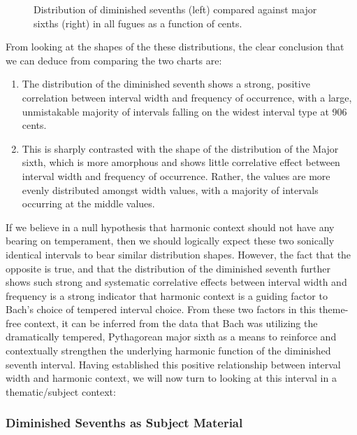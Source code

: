 \begin{figure}[H]
\vspace{1.5em}
    \centering
    \caption[Distribution of diminished sevenths compared against major sixths in all fugues as a function of cents. ]{Distribution of diminished sevenths (left) compared against major sixths (right) in all fugues as a function of cents.}
\end{figure}    From looking at the shapes of the these distributions, the clear
conclusion that we can deduce from comparing the two charts are:

\begin{enumerate}
\def\labelenumi{\arabic{enumi}.}
\tightlist
\item
  The distribution of the diminished seventh shows a strong, positive
  correlation between interval width and frequency of occurrence, with a
  large, unmistakable majority of intervals falling on the widest
  interval type at 906 cents.
\item
  This is sharply contrasted with the shape of the distribution of the
  Major sixth, which is more amorphous and shows little correlative
  effect between interval width and frequency of occurrence. Rather, the
  values are more evenly distributed amongst width values, with a
  majority of intervals occurring at the middle values.
\end{enumerate}

If we believe in a null hypothesis that harmonic context should not have
any bearing on temperament, then we should logically expect these two
sonically identical intervals to bear similar distribution shapes.
However, the fact that the opposite is true, and that the distribution
of the diminished seventh further shows such strong and systematic
correlative effects between interval width and frequency is a strong
indicator that harmonic context is a guiding factor to Bach's choice of
tempered interval choice. From these two factors in this theme-free
context, it can be inferred from the data that Bach was utilizing the
dramatically tempered, Pythagorean major sixth as a means to reinforce
and contextually strengthen the underlying harmonic function of the
diminished seventh interval. Having established this positive
relationship between interval width and harmonic context, we will now
turn to looking at this interval in a thematic/subject context:

    \subsubsection{Diminished Sevenths as Subject
Material}\label{diminished-sevenths-as-subject-material}

